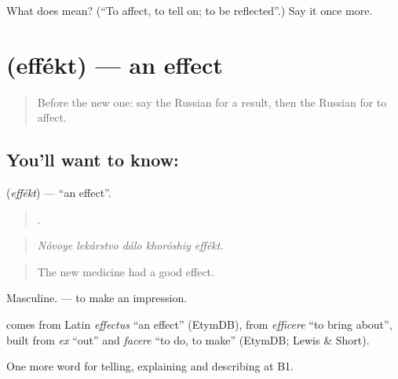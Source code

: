 \begin{tcolorbox}[breakable,colback=teal!4,colframe=teal!35!black,title={Before you move on}]
What does  mean? (\textquotedblleft{}To affect, to tell on; to be reflected\textquotedblright{}.) Say it once more.
\end{tcolorbox}
\section[\texorpdfstring{\ru{эффект} (effékt)}{эффект (effékt)}]{ (effékt) — an effect}

\label{lesson:RU-C350-effekt}



\begin{quote}
Before the new one: say the Russian for a result, then the Russian for to affect.
\end{quote}

\subsection*{You'll want to know: }
\textbf{} (\emph{effékt}) — \textquotedblleft{}an effect\textquotedblright{}.

\begin{quote}
    .
\end{quote}

\begin{quote}
\emph{Nóvoye lekárstvo dálo khoróshiy effékt.}
\end{quote}

\begin{quote}
The new medicine had a good effect.
\end{quote}

Masculine. \emph{ } — to make an impression.

\begin{cousinweb}
\textbf{} comes from Latin \emph{effectus} \textquotedblleft{}an effect\textquotedblright{} (EtymDB), from \emph{efficere} \textquotedblleft{}to bring about\textquotedblright{}, built from \emph{ex} \textquotedblleft{}out\textquotedblright{} and \emph{facere} \textquotedblleft{}to do, to make\textquotedblright{} (EtymDB; Lewis \& Short).
\end{cousinweb}

\begin{grammarlens}[title={What you've built}]
One more word for telling, explaining and describing at B1.
\end{grammarlens}

